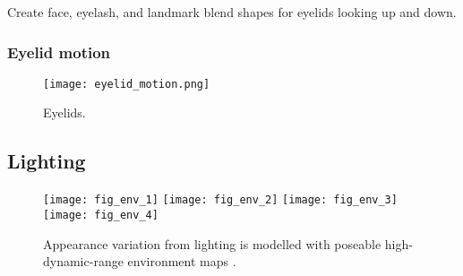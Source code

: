 Create face, eyelash, and landmark blend shapes for eyelids looking up and down.

\subsubsection{Eyelid motion}

\begin{figure}
    \texttt{[image: eyelid\_motion.png]}
    \caption{Eyelids.}
\end{figure}



\subsection{Lighting}

\begin{figure}
    \texttt{[image: fig\_env\_1]} \hfill
    \texttt{[image: fig\_env\_2]} \hfill
    \texttt{[image: fig\_env\_3]} \hfill
    \texttt{[image: fig\_env\_4]}
    \caption{Appearance variation from lighting is modelled with poseable high-dynamic-range environment maps \cite{debevec2002image}.}
    \label{fig:participants}
\end{figure}
